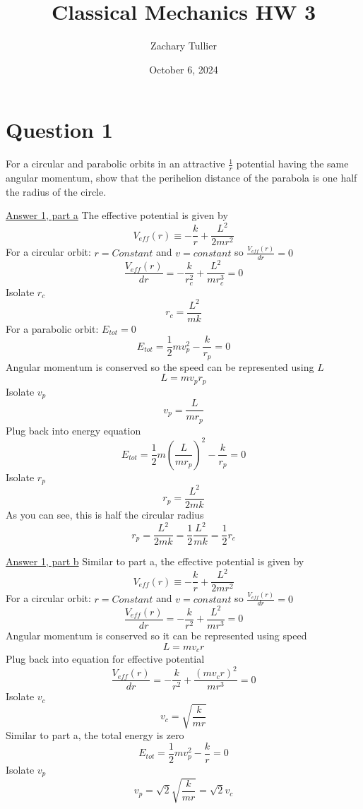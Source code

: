 \documentclass[12pt]{article}
\begin{document}
\singlespacing  %
\title{Classical Mechanics HW 3}

\author[1]{Zachary Tullier}
\date{October 6, 2024}

\maketitle

\section{Question 1}
    For a circular and parabolic orbits in an attractive $\frac{1}{r}$ potential having the same angular momentum, show that the perihelion distance of the parabola is one half the radius of the circle.

    \underline{Answer 1, part a}
    The effective potential is given by
    \[
        V_{eff}(r) \equiv -\frac{k}{r} + \frac{L^2}{2 m r^2}
    \]
    For a circular orbit: $r = Constant$ and $v = constant$ so $\frac{V_{eff}(r)}{dr} = 0$
    \[
        \frac{V_{eff}(r)}{dr} = - \frac{k}{r_c^2} + \frac{L^2}{m r_c^3} = 0
    \]
    Isolate $r_c$
    \[
        r_c = \frac{L^2}{m k}
    \]
    For a parabolic orbit: $E_{tot} = 0$
    \[
        E_{tot} = \frac{1}{2} m v_p^2 - \frac{k}{r_{p}} = 0
    \]
    Angular momentum is conserved so the speed can be represented using $L$
    \[
        L = m v_p r_p
    \]
    Isolate $v_p$
    \[
        v_p = \frac{L}{m r_p}
    \]
    Plug back into energy equation
    \[
        E_{tot} = \frac{1}{2} m \left(\frac{L}{m r_p} \right)^2 - \frac{k}{r_{p}} = 0
    \]
    Isolate $r_p$
    \[
        r_p = \frac{L^2}{2 m k}
    \]
    As you can see, this is half the circular radius
    \[
        r_p = \frac{L^2}{2 m k} = \frac{1}{2} \frac{L^2}{m k} = \frac{1}{2} r_c
    \]

    \underline{Answer 1, part b}
    Similar to part a, the effective potential is given by
    \[
        V_{eff}(r) \equiv -\frac{k}{r} + \frac{L^2}{2 m r^2}
    \]
    For a circular orbit: $r = Constant$ and $v = constant$ so $\frac{V_{eff}(r)}{dr} = 0$
    \[
        \frac{V_{eff}(r)}{dr} = - \frac{k}{r^2} + \frac{L^2}{m r^3} = 0
    \]
    Angular momentum is conserved so it can be represented using speed
    \[
        L = m v_c r
    \]
    Plug back into equation for effective potential
    \[
        \frac{V_{eff}(r)}{dr} = - \frac{k}{r^2} + \frac{\left(m v_c r \right)^2}{m r^3} = 0
    \]
    Isolate $v_c$
    \[
        v_c = \sqrt{\frac{k}{m r}}
    \]
    Similar to part a, the total energy is zero
    \[
        E_{tot} = \frac{1}{2} m v_p^2 - \frac{k}{r} = 0
    \]
    Isolate $v_p$
    \[
        v_p = \sqrt{2}  \sqrt{\frac{k}{m r}} = \sqrt{2} v_c
    \]
    
\end{document}
